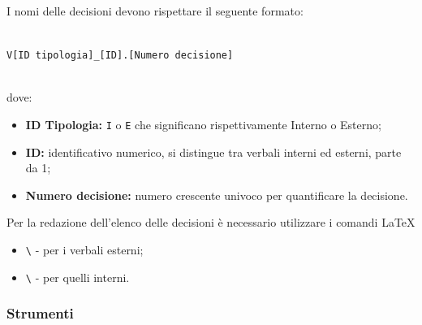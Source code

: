 	        I nomi delle decisioni devono rispettare il seguente formato:\\\\
            \centerline{\texttt{V[ID tipologia]\_[ID].[Numero decisione]}}\\
            dove:
            \begin{itemize}
            	\item \textbf{ID Tipologia:} \texttt{I} o \texttt{E} che significano rispettivamente Interno o Esterno;
            	 \item \textbf{ID:} identificativo numerico, si distingue tra verbali interni ed esterni, parte da 1;
            	 \item \textbf{Numero decisione:} numero crescente univoco per quantificare la decisione.
            \end{itemize}
			Per la redazione dell'elenco delle decisioni è necessario utilizzare i comandi \LaTeX
			\begin{itemize}
				\item \texttt{\textbackslash {}} - per i verbali esterni;
				\item \texttt{\textbackslash {}}  - per quelli interni.
			\end{itemize}
		
		\subsubsection{Strumenti}

